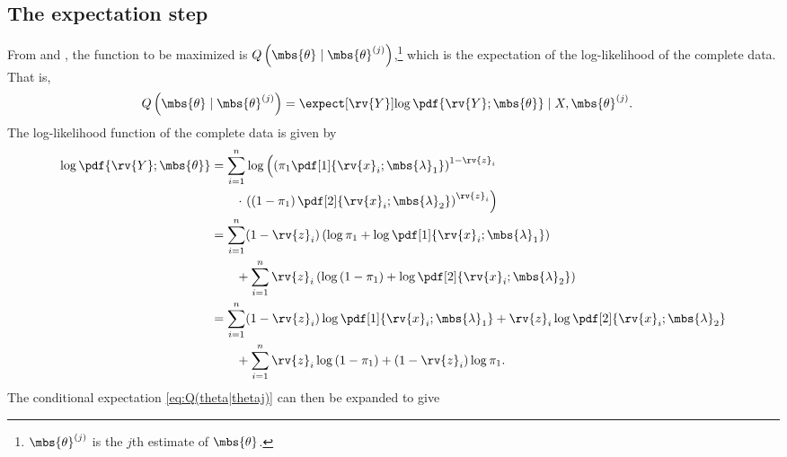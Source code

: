 \subsection{The expectation step}
From \cite{hastie_elements_2009} and \cite{wasserman_all_2004}, the function to be maximized is $Q\left(\mbs{\theta}\mid\mbs{\theta}^{(j)}\right)$,\footnote{$\mbs{\theta}^{(j)}$ is the $j$th estimate of $\mbs{\theta}$.} which is the expectation of the log-likelihood of the complete data. That is,
\begin{align}
    \label{eq:Q(theta|thetaj)}
    Q\left(\mbs{\theta}\mid\mbs{\theta}^{(j)}\right) &= \expect[\rv{Y}]{\log \pdf{\rv{Y} ; \mbs{\theta}} \mid X, \mbs{\theta}^{(j)}}.
\end{align}
The log-likelihood function of the complete data is given by
\begin{align}
    \log \pdf{\rv{Y} ; \mbs{\theta}} 
    &=
    \sum_{i=1}^{n}
    \log \left( \left(\pi_{1}\pdf[1]{\rv{x}_{i}; \mbs{\lambda}_{1}}\right)^{1-\rv{z}_{i}} \right.\nonumber\\&\qquad\cdot\left.\left( \left(1-\pi_{1}\right)\pdf[2]{\rv{x}_{i}; \mbs{\lambda}_{2}} \right)^{\rv{z}_{i}} \right) \\
    &=
    \sum_{i=1}^{n} (1-\rv{z}_{i})\left( \log \pi_{1}+ \log \pdf[1]{\rv{x}_{i}; \mbs{\lambda}_{1}} \right)\nonumber\\&\qquad
    +\sum_{i=1}^{n}\rv{z}_{i}\left(\log\left( 1-\pi_{1} \right)  + \log\pdf[2]{\rv{x}_{i}; \mbs{\lambda}_{2}}\right)\\
    &=
    \sum_{i=1}^{n} (1-\rv{z}_{i}) \log \pdf[1]{\rv{x}_{i}; \mbs{\lambda}_{1}} + \rv{z}_{i}\log\pdf[2]{\rv{x}_{i}; \mbs{\lambda}_{2}}
    \nonumber\\&\qquad
    +\sum_{i=1}^{n}\rv{z}_{i}\log\left( 1-\pi_{1} \right) + (1-\rv{z}_{i})\log \pi_{1}.
\end{align}
The conditional expectation \eqref{eq:Q(theta|thetaj)} can then be expanded to give
